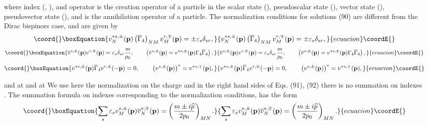 \documentclass[a4paper,12pt]{article}
\begin{document}
where index \coordHE{} (\coordHE{}, \coordHE{}),
and operator \coordHE{} is the creation operator of a
particle in the scalar state (\coordHE{}), pseudoscalar state
(\coordHE{}), vector state (\coordHE{}), pseudovector state
(\coordHE{}), and \coordHE{} is the
annihilation operator of a particle. The normalization conditions
for solutions (90) are different from the Dirac bispinors case,
and are given by
\begin{equation}\coord{}\boxEquation{
v_N^{*s,\pm }(\mathbf{p})\left( \overline{\Gamma }_4\right)
_{NM}v_M^{r,\mp }(\mathbf{p})=\pm \varepsilon _s\delta _{sr} ,
\label{91}
}{
v_N^{*s,\pm }(\mathbf{p})\left( \overline{\Gamma }_4\right)
_{NM}v_M^{r,\mp }(\mathbf{p})=\pm \varepsilon _s\delta _{sr} ,
}{ecuacion}\coordE{}\end{equation}
\begin{equation}\coord{}\boxEquation{
\overline{v}^{s,\pm }(\mathbf{p})v^{r,\mp
}(\mathbf{p})=\varepsilon _s\delta _{sr}\frac m{p_0} ,
\hspace{0.3in}\left( \overline{v}^{s,\pm }(\mathbf{p} )=v^{*s,\pm
}(\mathbf{p})\Gamma _4\overline{\Gamma }_4\right) ,\label{92}
}{
\overline{v}^{s,\pm }(\mathbf{p})v^{r,\mp
}(\mathbf{p})=\varepsilon _s\delta _{sr}\frac m{p_0} ,
\hspace{0.3in}\left( \overline{v}^{s,\pm }(\mathbf{p} )=v^{*s,\pm
}(\mathbf{p})\Gamma _4\overline{\Gamma }_4\right) ,}{ecuacion}\coordE{}\end{equation}
\begin{equation}\coord{}\boxEquation{
v^{*s,\pm }(\mathbf{p})\overline{\Gamma }_4v^{r,\pm
}(-\mathbf{p})=0 ,\hspace{0.3in}\left( v^{s,\pm
}(\mathbf{p})\right) ^{*}=v^{*s,\mp }(\mathbf{p }) , \label{93}
}{
v^{*s,\pm }(\mathbf{p})\overline{\Gamma }_4v^{r,\pm
}(-\mathbf{p})=0 ,\hspace{0.3in}\left( v^{s,\pm
}(\mathbf{p})\right) ^{*}=v^{*s,\mp }(\mathbf{p }) , }{ecuacion}\coordE{}\end{equation}

and \coordHE{} at \coordHE{}  \coordHE{} and \coordHE{} at \coordHE{}  \coordHE{} We use here the normalization on
the charge and in the right hand sides of Eqs. (91), (92) there is
no summation on indexes \coordHE{} . The summation formula on indexes \coordHE{}
corresponding to the normalization conditions, has the form
\begin{equation}\coord{}\boxEquation{
\sum_s\varepsilon _sv_M^{s,\pm }(\mathbf{p})\overline{v}_N^{s,\mp
}(\mathbf{p })=\left( \frac{m\pm i\widehat{p}}{2p_0}\right) _{MN}
. \label{94}
}{
\sum_s\varepsilon _sv_M^{s,\pm }(\mathbf{p})\overline{v}_N^{s,\mp
}(\mathbf{p })=\left( \frac{m\pm i\widehat{p}}{2p_0}\right) _{MN}
. }{ecuacion}\coordE{}\end{equation}
\end{document}
